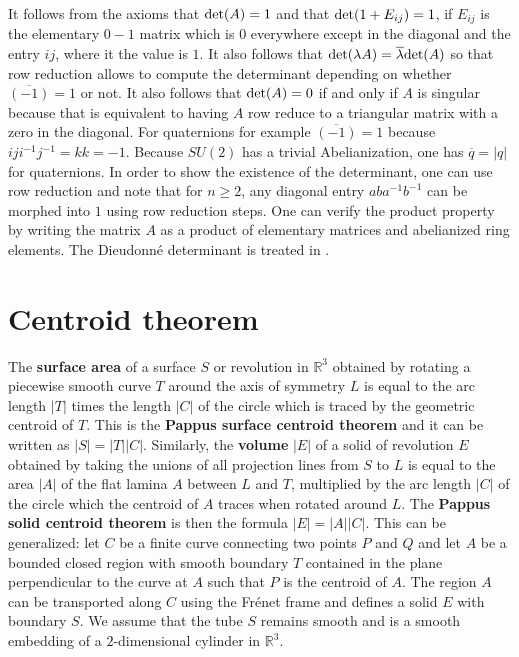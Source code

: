 \documentclass[12pt]{amsart}
\newcounter{example}    \def\example#1{ \item \fontsize{12}{15} \selectfont #1 \fontsize{12}{15} \selectfont }
\begin{document}
It follows from the axioms that ${\rm det}(A)=1$ and that 
${\rm det}(1+E_{ij})=1$, if $E_{ij}$ is the elementary $0-1$ matrix which is $0$ everywhere
except in the diagonal and the entry $ij$, where it the value is $1$. It also follows
that ${\rm det}(\lambda A) = \overline{\lambda} {\rm det}(A)$ so that row reduction 
allows to compute the determinant depending on whether $\overline{(-1)}=1$ or not.
It also follows that ${\rm det}(A)=0$ if and only if $A$ is singular because that is 
equivalent to having $A$ row reduce to a triangular matrix with a zero in the diagonal.
For quaternions for example $\overline{(-1)} =1$ because $i j i^{-1} j^{-1}=k k=-1$.
Because $SU(2)$ has a trivial Abelianization, one has $\overline{q}=|q|$ for quaternions. 
In order to show the existence of the determinant, one can use row reduction and note
that for $n \geq 2$, any diagonal entry $a b a^{-1} b^{-1}$ can be morphed into $1$
using row reduction steps. One can verify the product property by writing the matrix $A$
as a product of elementary matrices and abelianized ring elements. 
The Dieudonn\'e determinant is treated in 
\cite{ArtinGeometricAlgebra,Brenner1968,RosenbergKTheory}.


\section{Centroid theorem}

The {\bf surface area} of a surface $S$ or revolution in $\mathbb{R}^3$ obtained by rotating
a piecewise smooth curve $T$ around the axis of symmetry $L$ is equal to the 
arc length $|T|$ times the length $|C|$ of the circle which is
traced by the geometric centroid of $T$. This is the {\bf Pappus surface centroid theorem} 
and it can be written as $|S| = |T| |C|$. Similarly, the {\bf volume} $|E|$ of a solid 
of revolution $E$ obtained by taking the unions of all projection lines from $S$ to $L$ is equal 
to the area $|A|$ of the flat lamina $A$ between $L$ and $T$, multiplied by the arc length 
$|C|$ of the circle which the centroid of $A$ traces when rotated around $L$.
The {\bf Pappus solid centroid theorem} is then the formula $|E|= |A| |C|$.
This can be generalized: let $C$ be a finite curve connecting two points $P$ and 
$Q$ and let $A$ be a bounded closed region with smooth boundary $T$ contained
in the plane perpendicular to the curve at $A$ such that $P$ is the centroid of $A$. 
The region $A$ can be transported along $C$ using the Fr\'enet frame and 
defines a solid $E$ with boundary $S$. We assume that the tube $S$ remains 
smooth and is a smooth embedding of a $2$-dimensional 
cylinder in $\mathbb{R}^3$. 
\end{document}
